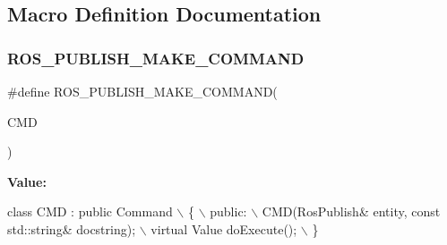 \subsection{Macro Definition Documentation}
\mbox{\label{ros__publish_8hh_a9201180ce4ec1ca81883161ab4506350}} 
\subsubsection{\texorpdfstring{R\+O\+S\+\_\+\+P\+U\+B\+L\+I\+S\+H\+\_\+\+M\+A\+K\+E\+\_\+\+C\+O\+M\+M\+A\+ND}{ROS\_PUBLISH\_MAKE\_COMMAND}}
{\footnotesize\ttfamily \#define R\+O\+S\+\_\+\+P\+U\+B\+L\+I\+S\+H\+\_\+\+M\+A\+K\+E\+\_\+\+C\+O\+M\+M\+A\+ND(\begin{DoxyParamCaption}\item[{}]{C\+MD }\end{DoxyParamCaption})}

{\bfseries Value\+:}
\begin{DoxyCode}
\textcolor{keyword}{class }CMD : \textcolor{keyword}{public} Command                                 \(\backslash\)
    \{                                                          \(\backslash\)
    public:                                                    \(\backslash\)
        CMD(RosPublish& entity, \textcolor{keyword}{const} std::string& docstring); \(\backslash\)
        virtual Value doExecute();                             \(\backslash\)
    \}
\end{DoxyCode}
